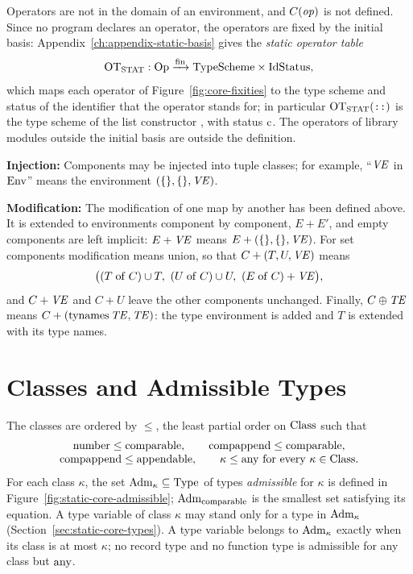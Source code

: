 Operators are not in the domain of an environment, and $C(\mathit{op})$ is not
defined. Since no program declares an operator, the operators are fixed by the
initial basis: Appendix~\ref{ch:appendix-static-basis} gives the \emph{static
operator table}
\[
  \mathrm{OT}_{\mathrm{STAT}} : \mathrm{Op} \xrightarrow{\mathrm{fin}} \mathrm{TypeScheme} \times \mathrm{IdStatus} ,
\]
which maps each operator of Figure~\ref{fig:core-fixities} to the type scheme
and status of the identifier that the operator stands for; in particular
$\mathrm{OT}_{\mathrm{STAT}}(\textnormal{\texttt{::}})$ is the type scheme of the list constructor \kw{::}, with
status $\mathrm{c}$. The operators of library modules outside the initial basis are
outside the definition. %

\textbf{Injection:} Components may be injected into tuple classes; for example,
``$\mathit{VE}$ in $\mathrm{Env}$'' means the environment $(\{\}, \{\}, \mathit{VE})$.

\textbf{Modification:} The modification of one map by another has been defined
above. It is extended to environments component by component, $E + E'$, and
empty components are left implicit: $E + \mathit{VE}$ means $E + (\{\},
\{\}, \mathit{VE})$. For set components modification means union, so that $C +
(T, U, \mathit{VE})$ means
\[
  \big((T \mathrel{\mathrm{of}} C) \cup T,\ (U \mathrel{\mathrm{of}} C) \cup U,\ (E \mathrel{\mathrm{of}} C) + \mathit{VE}\big),
\]
and $C + \mathit{VE}$ and $C + U$ leave the other components unchanged. Finally,
$C \oplus \mathit{TE}$ means $C + (\mathrm{tynames}\, \mathit{TE}, \mathit{TE})$: the type environment is added
and $T$ is extended with its type names.

\section{Classes and Admissible Types}\label{sec:static-core-classes}

The classes are ordered by $\leq$, the least partial order on $\mathrm{Class}$ such
that
\[
\begin{array}{@{}c@{}}
  \knum \leq \kcomp, \qquad \kcapp \leq \kcomp,\\
  \kcapp \leq \kapp, \qquad \kappa \leq \kany\ \text{for every}\ \kappa \in \Class.
\end{array}
\]
For each class $\kappa$, the set $\mathrm{Adm}_{\kappa} \subseteq \mathrm{Type}$ of types
\emph{admissible} for $\kappa$ is defined in Figure~\ref{fig:static-core-admissible};
$\mathrm{Adm}_{\mathrm{comparable}}$ is the smallest set satisfying its equation. A type variable of
class $\kappa$ may stand only for a type in $\mathrm{Adm}_{\kappa}$
(Section~\ref{sec:static-core-types}). A type variable belongs to
$\mathrm{Adm}_{\kappa}$ exactly when its class is at most $\kappa$; no record type and no
function type is admissible for any class but $\mathrm{any}$.

